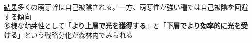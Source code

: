 \documentclass[a0, 36pt, plainboxedsections]{sciposter} %
\begin{document}
\begin{multicols}{2}
\begin{mdframed}[style=conclusion.frame]
  \vspace{0.4em}
  \normalsize{\underline{結果}多くの萌芽幹は自己被陰される。一方、萌芽性が強い種では自己被陰を回避する傾向\\
  }
  \large{\faHandLeft \vspace{0.02em} 多様な萌芽性として「\textbf{より上層で光を獲得する}」と「\textbf{下層でより効率的に光を受ける}」という戦略分化が森林内でみられる
  } %
\end{mdframed}
\end{multicols}
\begin{mdframed}[style=section.frame]
  \centering\huge\textbf{}
\end{mdframed}
\end{document}
